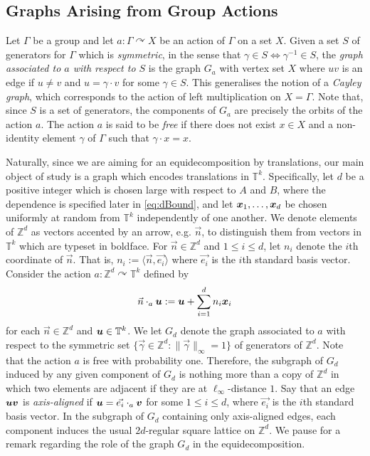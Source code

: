\documentclass[12pt,a4paper]{amsart}
\numberwithin{equation}{section}
\newcommand{\actson}{{\curvearrowright}}
\theoremstyle{definition}
\begin{document}
\subsection{Graphs Arising from Group Actions}

Let $\Gamma$ be a group and let $a:\Gamma\actson X$ be an action of $\Gamma$ on a set $X$. Given a set $S$ of generators for $\Gamma$ which is \emph{symmetric}, in the sense that $\gamma\in S \Longleftrightarrow \gamma^{-1}\in S$, the \emph{graph associated to $a$ with respect to $S$} is the graph $G_a$ with vertex set $X$ where $uv$ is an edge if $u\neq v$ and $u=\gamma\cdot v$ for some $\gamma\in S$. This generalises the notion of a \emph{Cayley graph}, which corresponds to the action of left multiplication on $X=\Gamma$. Note that, since $S$ is a set of generators, the components of $G_a$ are precisely the orbits of the action $a$. The action $a$ is said to be \emph{free} if there does not exist $x\in X$ and a non-identity element $\gamma$ of $\Gamma$ such that $\gamma\cdot x=x$. 

Naturally, since we are aiming for an equidecomposition by translations, our main object of study is a graph which encodes translations in $\mathbb{T}^k$. Specifically, let $d$ be a positive integer which is chosen large with respect to $A$ and $B$, where the dependence is specified later in \eqref{eq:dBound}, and let $\boldsymbol{x}_1,\dots,\boldsymbol{x}_d$ be chosen uniformly at random from $\mathbb{T}^k$ independently of one another. We denote elements of $\mathbb{Z}^d$ as vectors accented by an arrow, e.g. $\vec{n}$, to distinguish them from vectors in $\mathbb{T}^k$ which are typeset in boldface. For $\vec{n}\in\mathbb{Z}^d$ and $1\leq i\leq d$, let $n_i$ denote the $i$th coordinate of $\vec{n}$. That is, $n_i:=\langle \vec{n},\vec{e_i}\rangle$ where $\vec{e_i}$ is the $i$th standard basis vector. Consider the action $a:\mathbb{Z}^d\actson \mathbb{T}^k$ defined by
\[\vec{n}\cdot_a \boldsymbol{u} := \boldsymbol{u} + \sum_{i=1}^dn_i\boldsymbol{x}_i\]
for each $\vec{n}\in \mathbb{Z}^d$ and $\boldsymbol{u}\in\mathbb{T}^k$. We let $G_d$ denote the graph associated to $a$ with respect to the symmetric set $\{\vec{\gamma}\in\mathbb{Z}^d: \|\vec{\gamma}\|_\infty=1\}$ of generators of $\mathbb{Z}^d$. Note that the action $a$ is free with probability one. Therefore, the subgraph of $G_d$ induced by any given component of $G_d$ is nothing more than a copy of $\mathbb{Z}^d$ in which two elements are adjacent if they are at $\ell_\infty$-distance $1$. Say that an edge $\boldsymbol{u}\boldsymbol{v}$ is \emph{axis-aligned} if $\boldsymbol{u}=\vec{e_i}\cdot_a\boldsymbol{v}$ for some $1\leq i\leq d$, where $\vec{e_i}$ is the $i$th standard basis vector. In the subgraph of $G_d$ containing only axis-aligned edges, each component induces the usual $2d$-regular square lattice on $\mathbb{Z}^d$. We pause for a remark regarding the role of the graph $G_d$ in the equidecomposition. 
\end{document}
